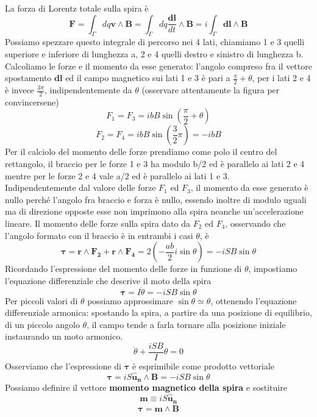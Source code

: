 \documentclass[10pt,a4paper]{article}
\begin{document}
\FloatBarrier
La forza di Lorentz totale sulla spira è
\[\mathbf{F}= \int_{\Gamma}dq\mathbf{v}\wedge\mathbf{B}= \int_{\Gamma}dq\frac{\mathbf{dl}}{dt}\wedge\mathbf{B}= i \int_{\Gamma}\mathbf{dl}\wedge\mathbf{B}\]
Possiamo spezzare questo integrale di percorso nei 4 lati, chiamiamo 1 e 3 quelli superiore e inferiore di lunghezza a, 2 e 4 quelli destro e sinistro di lunghezza b.\\
Calcoliamo le forze e il momento da esse generato: l'angolo compreso fra il vettore spostamento $\mathbf{dl}$ ed il campo magnetico sui lati 1 e 3 è pari a \(\frac{\pi}{2}+\theta\), per i lati 2 e 4 è invece \(\frac{3\pi}{2}\), indipendentemente da $\theta$ (osservare attentamente la figura per convincersene)
\[F_1=F_3=ibB\sin(\frac{\pi}{2}+\theta)\]
\[F_2=F_4 = ibB\sin(\frac{3}{2}\pi)= -ibB\]
Per il calciolo del momento delle forze prendiamo come polo il centro del rettangolo, il braccio per le forze 1 e 3 ha modulo b/2 ed è parallelo ai lati 2 e 4 mentre per le forze 2 e 4 vale a/2 ed è parallelo ai lati 1 e 3.\\
Indipendentemente dal valore delle forze  \(F_1\) ed \(F_3\), il momento da esse generato è nullo perché l'angolo fra braccio e forza è nullo, essendo inoltre di modulo uguali ma di direzione opposte esse non imprimono alla spira neanche un'accelerazione lineare.
Il momento delle forze sulla spira dato da \(F_2\) ed \(F_4\), osservando che l'angolo formato con il braccio è in entrambi i casi $\theta$, è
\[\mathbf{\tau}= \mathbf{r}\wedge\mathbf{F_2}+\mathbf{r}\wedge\mathbf{F_4}=2(-\frac{ab}{2}i\sin\theta)= -i SB \sin\theta\]
Ricordando l'espressione del momento delle forze in funzione di $\theta$, impostiamo l'equazione differenziale che descrive il moto della spira
\[\mathbf{\tau}=I\ddot{\theta}=- iSB\sin\theta\]
Per piccoli valori di $\theta$ possiamo approssimare $\sin\theta \simeq \theta$, ottenendo l'equazione differenziale armonica: spostando la spira, a partire da una posizione di equilibrio, di un piccolo angolo $\theta$, il campo tende a farla tornare alla posizione iniziale instaurando un moto armonico. 
\[\ddot{\theta}+ \frac{iSB}{I}\theta= 0 \]
Osserviamo che l'espressione di $\mathbf{\tau}$ è esprimibile come prodotto vettoriale
\[\mathbf{\tau}=iS\mathbf{\hat{u}_n}\wedge\mathbf{B}=-iSB\sin\theta\]
Possiamo definire il vettore \textbf{momento magnetico della spira} e sostituire
\[\mathbf{m}\equiv iS\mathbf{\hat{u}_n}\] 
\begin{align}\label{eq:momento_spira}
	\mathbf{\tau}=\mathbf{m}\wedge\mathbf{B}
\end{align}
\end{document}
